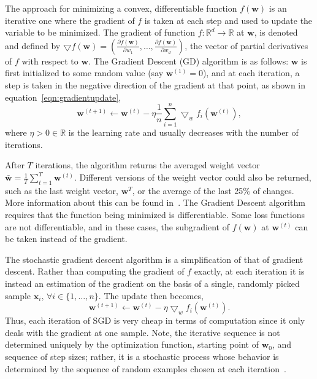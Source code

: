\documentclass[reqno]{vcuthesis}
\newcommand{\reals}{{\mathbb{R}}}
\numberwithin{equation}{chapter}
\begin{document}
The approach for minimizing a convex, differentiable function $f(\bm{w})$ is an iterative one where the gradient of $f$ is taken at each step and used to update the variable to be minimized. The gradient of function $f : \mathbb{R}^d \rightarrow \mathbb{R}$ at $\bm{w}$, is denoted and defined by $\bigtriangledown f(\bm{w}) = \left(\frac{\partial f(\bm{w})}{\partial w_1}, \ldots, \frac{\partial f(\bm{w})}{\partial w_d}\right)$, the vector of partial derivatives of $f$ with respect to $\bm{w}$. The Gradient Descent (GD) algorithm is as follows: $\bm{w}$ is first initialized to some random value (say $\bm{w}^{(1)} = 0$), and at each iteration, a step is taken in the negative direction of the gradient at that point, as shown in equation~\ref{eqn:gradientupdate},
\begin{equation}
\bm{w}^{(t+1)} \leftarrow \bm{w}^{(t)} - \eta \frac{1}{n} \sum_{i=1}^n\bigtriangledown_w f_i(\bm{w}^{(t)}),
\label{eqn:gradientupdate}
\end{equation}
where $\eta > 0 \in \reals$ is the learning rate and usually decreases with the number of iterations.

After $T$ iterations, the algorithm returns the averaged weight vector $\bm{\bar{w}} = \frac{1}{T}\sum_{t=1}^T \bm{w}^{(t)}$. Different versions of the weight vector could also be returned, such as the last weight vector, $\bm w^T$, or the average of the last 25\% of changes. More information about this can be found in~\cite{Melki2016}. The Gradient Descent algorithm requires that the function being minimized is differentiable. Some loss functions are not differentiable, and in these cases, the subgradient of $f(\bm{w})$ at $\bm{w}^{(t)}$ can be taken instead of the gradient. 

The stochastic gradient descent algorithm is a simplification of that of gradient descent. Rather than computing the gradient of $f$ exactly, at each iteration it is instead an estimation of the gradient on the basis of a single, randomly picked sample $\bm x_i,\, \forall i \in \{1, \ldots, n\}$. The update then becomes,
\begin{equation}
\bm{w}^{(t+1)} \leftarrow \bm{w}^{(t)} - \eta\bigtriangledown_w f_i(\bm{w}^{(t)}).
\label{eqn:gradientupdateo}
\end{equation}
Thus, each iteration of SGD is very cheap in terms of computation since it only deals with the gradient at one sample. Note, the iterative sequence is not determined uniquely by the optimization function, starting point of $\bm w_0$, and sequence of step sizes; rather, it is a stochastic process whose behavior is determined by the sequence of random examples chosen at each iteration~\cite{bottou2010large,bottou2018optimization}.
\end{document}
